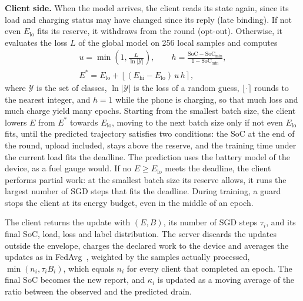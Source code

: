 \textbf{Client side.}
When the model arrives, the client reads its state again, since its load and
charging status may have changed since its reply (late binding). If not even
$E_{\mathrm{lo}}$ fits its reserve, it withdraws from the round (opt-out).
Otherwise, it evaluates the loss $L$ of the global model on 256 local samples
and computes
\begin{equation}
  \begin{gathered}
  u = \min\!\left(1, \frac{L}{\ln|\mathcal{Y}|}\right), \qquad
  h = \frac{\mathrm{SoC}-\mathrm{SoC}_{\min}}{1-\mathrm{SoC}_{\min}},\\
  E^\ast = E_{\mathrm{lo}} + \left\lfloor (E_{\mathrm{hi}}-E_{\mathrm{lo}})\,u\,h \right\rceil,
  \end{gathered}
  \label{eq:decision}
\end{equation}
where $\mathcal{Y}$ is the set of classes, $\ln|\mathcal{Y}|$ is the loss of a
random guess, $\lfloor\cdot\rceil$ rounds to the nearest integer, and $h=1$
while the phone is charging, so that much loss and much charge yield many
epochs. Starting from the smallest batch size, the client lowers $E$ from
$E^\ast$ towards $E_{\mathrm{lo}}$, moving to the next batch size only if not
even $E_{\mathrm{lo}}$ fits, until the predicted trajectory satisfies two
conditions: the SoC at the end of the round, upload included, stays above the
reserve, and the training time under the current load fits the deadline. The
prediction uses the battery model of the device, as a fuel gauge would. If no
$E\geq E_{\mathrm{lo}}$ meets the deadline, the client performs partial work:
at the smallest batch size its reserve allows, it runs the largest number of
SGD steps that fits the deadline. During training, a guard stops the client at
its energy budget, even in the middle of an epoch.

The client returns the update with $(E,B)$, its number of SGD steps $\tau_i$,
and its final SoC, load, loss and label distribution. The server discards the
updates outside the envelope, charges the declared work to the device and
averages the updates as in FedAvg~\cite{mcmahan2017fedavg}, weighted by the
samples actually processed, $\min(n_i,\tau_iB_i)$, which equals $n_i$ for every
client that completed an epoch. The final SoC becomes the new report, and
$\kappa_i$ is updated as a moving average of the ratio between the observed and
the predicted drain.

